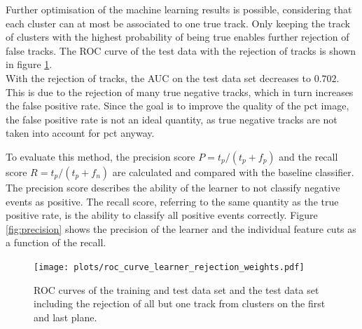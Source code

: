 Further optimisation of the machine learning results is possible, considering that each cluster can at most be associated to one true track.
Only keeping the track of clusters with the highest probability of being true enables further rejection of
false tracks. The ROC curve of the test data with the rejection of tracks is shown in figure \ref{fig:rejection}. \\
With the rejection of tracks, the AUC on the test data set decreases to $0.702$. This is due to the rejection of many true negative tracks, which in turn increases
the false positive rate. Since the goal is to improve the quality of the pct image, the false positive rate is not an ideal quantity, as true negative tracks
are not taken into account for pct anyway.

To evaluate this method, the precision score $P=t_p/(t_p + f_p)$ and the recall score $R=t_p/(t_p + f_n)$ are calculated and compared with the baseline classifier. The precision
score describes the ability of the learner to not classify negative events as positive. The recall score, referring to the same quantity as the true positive rate,
is the ability to classify all positive events correctly.
Figure \ref{fig:precision} shows the precision of the learner and the individual feature cuts as a function of the recall.

\begin{figure}[H]
  \centering
  \texttt{[image: plots/roc\_curve\_learner\_rejection\_weights.pdf]}
  \caption{ROC curves of the training and test data set and the test data set including the rejection of all but one track from clusters on the first and last plane.}
  \label{fig:rejection}
\end{figure}



